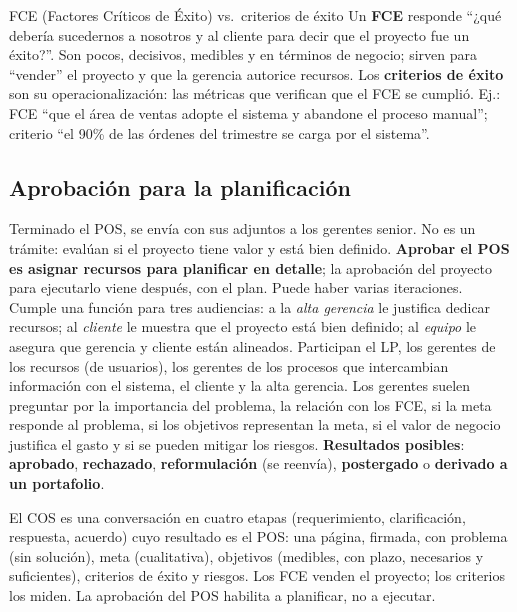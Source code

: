 \documentclass[11pt,a4paper]{article}
\begin{document}
\begin{defbox}{FCE (Factores Críticos de Éxito) vs.\ criterios de éxito}
Un \textbf{FCE} responde ``¿qué debería sucedernos a nosotros y al cliente para decir que el proyecto fue un
éxito?''. Son pocos, decisivos, medibles y en términos de negocio; sirven para ``vender'' el proyecto y que la
gerencia autorice recursos. Los \textbf{criterios de éxito} son su operacionalización: las métricas que
verifican que el FCE se cumplió. Ej.: FCE ``que el área de ventas adopte el sistema y abandone el proceso
manual''; criterio ``el 90\% de las órdenes del trimestre se carga por el sistema''.
\end{defbox}

\subsection{Aprobación para la planificación}
Terminado el POS, se envía con sus adjuntos a los gerentes senior. No es un trámite: evalúan si el proyecto
tiene valor y está bien definido. \textbf{Aprobar el POS es asignar recursos para planificar en detalle}; la
aprobación del proyecto para ejecutarlo viene después, con el plan. Puede haber varias iteraciones. Cumple una
función para tres audiencias: a la \emph{alta gerencia} le justifica dedicar recursos; al \emph{cliente} le
muestra que el proyecto está bien definido; al \emph{equipo} le asegura que gerencia y cliente están
alineados. Participan el LP, los gerentes de los recursos (de usuarios), los gerentes de los procesos que
intercambian información con el sistema, el cliente y la alta gerencia. Los gerentes suelen preguntar por la
importancia del problema, la relación con los FCE, si la meta responde al problema, si los objetivos
representan la meta, si el valor de negocio justifica el gasto y si se pueden mitigar los riesgos.
\textbf{Resultados posibles}: \textbf{aprobado}, \textbf{rechazado}, \textbf{reformulación} (se reenvía),
\textbf{postergado} o \textbf{derivado a un portafolio}.

\begin{enresumen}
El COS es una conversación en cuatro etapas (requerimiento, clarificación, respuesta, acuerdo) cuyo resultado
es el POS: una página, firmada, con problema (sin solución), meta (cualitativa), objetivos (medibles, con
plazo, necesarios y suficientes), criterios de éxito y riesgos. Los FCE venden el proyecto; los criterios los
miden. La aprobación del POS habilita a planificar, no a ejecutar.
\end{enresumen}
\end{document}
